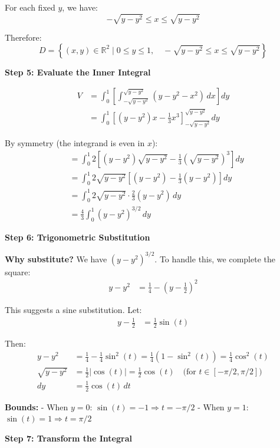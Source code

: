 For each fixed $y$, we have:
\[
-\sqrt{y - y^2} \leq x \leq \sqrt{y - y^2}
\]
 
Therefore:
\[
D = \left\{ (x,y) \in \mathbb{R}^2 \mid 0 \leq y \leq 1, \quad -\sqrt{y - y^2} \leq x \leq \sqrt{y - y^2} \right\}
\]
 
\textbf{Step 5: Evaluate the Inner Integral}
 
\begin{align*}
V &= \int_0^1 \left[\int_{-\sqrt{y-y^2}}^{\sqrt{y-y^2}} (y - y^2 - x^2) \, dx\right] dy \\
&= \int_0^1 \left[(y-y^2)x - \frac{1}{3}x^3\right]_{-\sqrt{y-y^2}}^{\sqrt{y-y^2}} dy
\end{align*}
 
By symmetry (the integrand is even in $x$):
\begin{align*}
&= \int_0^1 2\left[(y-y^2)\sqrt{y-y^2} - \frac{1}{3}\left(\sqrt{y-y^2}\right)^3\right] dy \\
&= \int_0^1 2\sqrt{y-y^2}\left[(y-y^2) - \frac{1}{3}(y-y^2)\right] dy \\
&= \int_0^1 2\sqrt{y-y^2} \cdot \frac{2}{3}(y-y^2) \, dy \\
&= \frac{4}{3}\int_0^1 (y-y^2)^{3/2} \, dy
\end{align*}
 
\textbf{Step 6: Trigonometric Substitution}
 
\textbf{Why substitute?} We have $(y - y^2)^{3/2}$. To handle this, we complete the square:
\begin{align*}
y - y^2 &= \frac{1}{4} - \left(y - \frac{1}{2}\right)^2
\end{align*}
 
This suggests a sine substitution. Let:
\begin{align*}
y - \frac{1}{2} &= \frac{1}{2}\sin(t)
\end{align*}
 
Then:
\begin{align*}
y - y^2 &= \frac{1}{4} - \frac{1}{4}\sin^2(t) = \frac{1}{4}(1 - \sin^2(t)) = \frac{1}{4}\cos^2(t) \\
\sqrt{y-y^2} &= \frac{1}{2}|\cos(t)| = \frac{1}{2}\cos(t) \quad \text{(for } t \in [-\pi/2, \pi/2])\\
dy &= \frac{1}{2}\cos(t) \, dt
\end{align*}
 
\textbf{Bounds:} 
- When $y = 0$: $\sin(t) = -1 \Rightarrow t = -\pi/2$
- When $y = 1$: $\sin(t) = 1 \Rightarrow t = \pi/2$
 
\textbf{Step 7: Transform the Integral}
 
